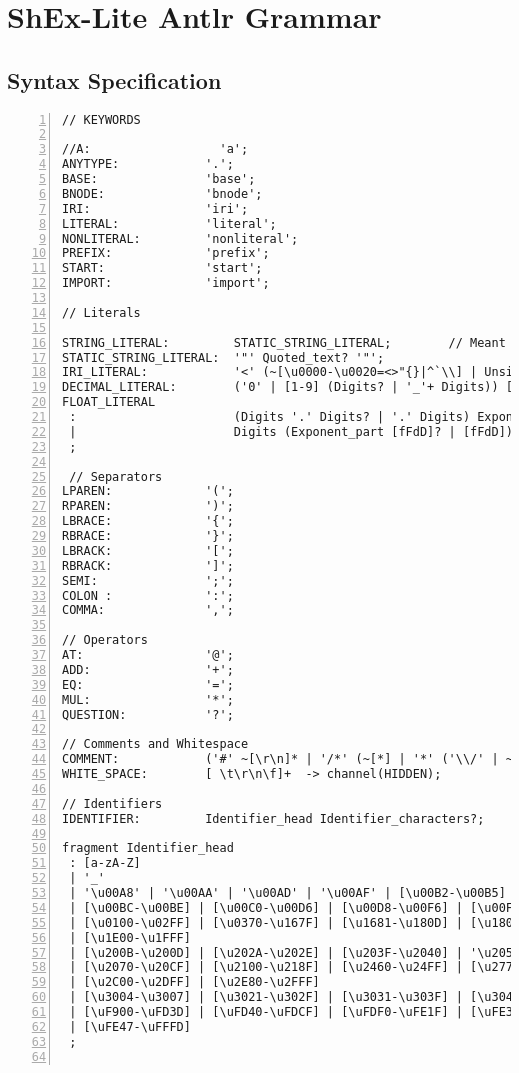 \chapter{ShEx-Lite Antlr Grammar}
\section{Syntax Specification}
\begin{lstlisting}[numbers=left,basicstyle=\ttfamily\scriptsize]
// KEYWORDS

//A:                  'a';
ANYTYPE:            '.';
BASE:               'base';
BNODE:              'bnode';
IRI:                'iri';
LITERAL:		    'literal';
NONLITERAL:         'nonliteral';
PREFIX:             'prefix';
START:              'start';
IMPORT:             'import';
    
// Literals
    
STRING_LITERAL:         STATIC_STRING_LITERAL;        // Meant to be extended with interpolated text. (from Swift 3)
STATIC_STRING_LITERAL:  '"' Quoted_text? '"';
IRI_LITERAL:            '<' (~[\u0000-\u0020=<>"{}|^`\\] | Unsigned_character)* '>';
DECIMAL_LITERAL:        ('0' | [1-9] (Digits? | '_'+ Digits)) [lL]?;
FLOAT_LITERAL
 :                      (Digits '.' Digits? | '.' Digits) Exponent_part? [fFdD]?
 |                      Digits (Exponent_part [fFdD]? | [fFdD])
 ;

 // Separators
LPAREN:             '(';
RPAREN:             ')';
LBRACE:             '{';
RBRACE:             '}';
LBRACK:             '[';
RBRACK:             ']';
SEMI:               ';';
COLON :             ':';
COMMA:              ',';

// Operators
AT:                 '@';
ADD:                '+';
EQ:                 '=';
MUL:                '*';
QUESTION:           '?';

// Comments and Whitespace
COMMENT:            ('#' ~[\r\n]* | '/*' (~[*] | '*' ('\\/' | ~[/]))* '*/') -> channel(HIDDEN);
WHITE_SPACE:        [ \t\r\n\f]+  -> channel(HIDDEN);

// Identifiers
IDENTIFIER:         Identifier_head Identifier_characters?;

fragment Identifier_head
 : [a-zA-Z]
 | '_'
 | '\u00A8' | '\u00AA' | '\u00AD' | '\u00AF' | [\u00B2-\u00B5] | [\u00B7-\u00BA]
 | [\u00BC-\u00BE] | [\u00C0-\u00D6] | [\u00D8-\u00F6] | [\u00F8-\u00FF]
 | [\u0100-\u02FF] | [\u0370-\u167F] | [\u1681-\u180D] | [\u180F-\u1DBF]
 | [\u1E00-\u1FFF]
 | [\u200B-\u200D] | [\u202A-\u202E] | [\u203F-\u2040] | '\u2054' | [\u2060-\u206F]
 | [\u2070-\u20CF] | [\u2100-\u218F] | [\u2460-\u24FF] | [\u2776-\u2793]
 | [\u2C00-\u2DFF] | [\u2E80-\u2FFF]
 | [\u3004-\u3007] | [\u3021-\u302F] | [\u3031-\u303F] | [\u3040-\uD7FF]
 | [\uF900-\uFD3D] | [\uFD40-\uFDCF] | [\uFDF0-\uFE1F] | [\uFE30-\uFE44]
 | [\uFE47-\uFFFD]
 ;


\end{lstlisting}
